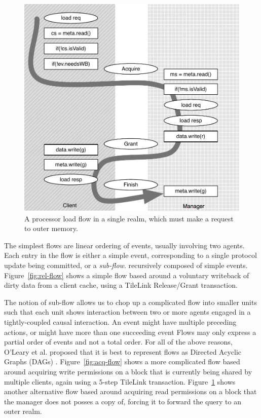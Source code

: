 \begin{figure}
\centering
\includegraphics[width=0.8\columnwidth]{coherence/figures/outer-acq-flow.pdf}
\caption[A processor store flow.]{
A processor load flow in a single realm, which must make a request to outer memory.
}
\label{fig:outer-acq-flow}
\end{figure}

The simplest flows are linear ordering of events, usually involving two agents.
Each entry in the flow is either a simple event, 
corresponding to a single protocol update being committed,
or a \emph{sub-flow}. recursively composed of simple events.
Figure~\ref{fig:rel-flow} shows a simple flow based around a voluntary writeback of dirty data from a client cache,
using a TileLink Release/Grant transaction.

The notion of sub-flow allows us to
chop up a complicated flow into smaller units such that each
unit shows interaction between two or more agents engaged in a tightly-coupled causal interaction.
An event might have multiple preceding actions,
or might have more than one succeeding event
Flows may only express a partial order of events and not a total order.
For all of the above reasons, O'Leary et al. proposed that it is best to represent flows as Directed Acyclic Graphs (DAGs)
\cite{oleary-fmcad09}.
Figure~\ref{fig:acq-flow} shows a more complicated flow based around acquiring write permissions on a block that is currently being
shared by multiple clients, again using a 5-step TileLink transaction.
Figure~\ref{fig:outer-acq-flow} shows another alternative flow based around acquiring read permissions on a block that the manager does not posses a copy of, forcing it to forward the query to an outer realm.

